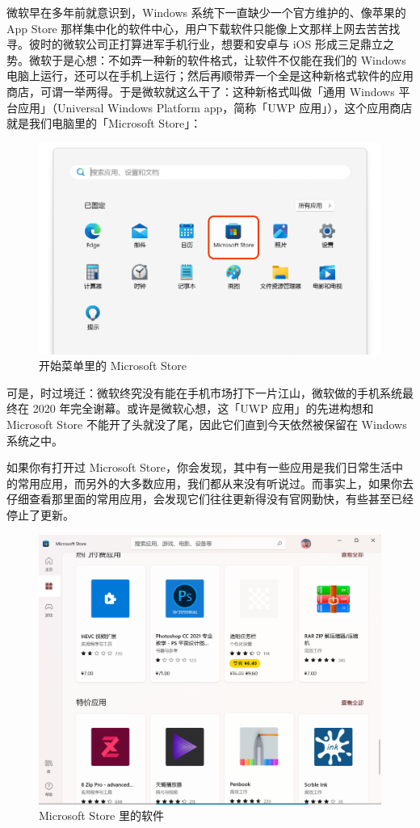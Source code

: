 {{微软早在多年前就意识到，Windows 系统下一直缺少一个官方维护的、像苹果的 App Store 那样集中化的软件中心，用户下载软件只能像上文那样上网去苦苦找寻。彼时的微软公司正打算进军手机行业，想要和安卓与 iOS 形成三足鼎立之势。微软于是心想：不如弄一种新的软件格式，让软件不仅能在我们的 Windows 电脑上运行，还可以在手机上运行；然后再顺带弄一个全是这种新格式软件的应用商店，可谓一举两得。于是微软就这么干了：这种新格式叫做「通用 Windows 平台应用」（Universal Windows Platform app，简称「UWP 应用」），这个应用商店就是我们电脑里的「Microsoft Store」：

\begin{figure}[htb!]
  \centering
  \includegraphics[width=.7\textwidth]{assets/basic/Microsoft_Store.png}
  \caption{开始菜单里的 Microsoft Store}
  \label{fig:Microsoft_Store}
\end{figure}

可是，时过境迁：微软终究没有能在手机市场打下一片江山，微软做的手机系统最终在 2020 年完全谢幕。或许是微软心想，这「UWP 应用」的先进构想和 Microsoft Store 不能开了头就没了尾，因此它们直到今天依然被保留在 Windows 系统之中。

如果你有打开过 Microsoft Store，你会发现，其中有一些应用是我们日常生活中的常用应用，而另外的大多数应用，我们都从来没有听说过。而事实上，如果你去仔细查看那里面的常用应用，会发现它们往往更新得没有官网勤快，有些甚至已经停止了更新。

\begin{figure}[htb!]
  \centering
  \includegraphics[width=.6\textwidth]{assets/basic/Software_in_MS_Store.png}
  \caption{Microsoft Store 里的软件}
  \label{fig:Software_in_MS_Store}
\end{figure}

}}
